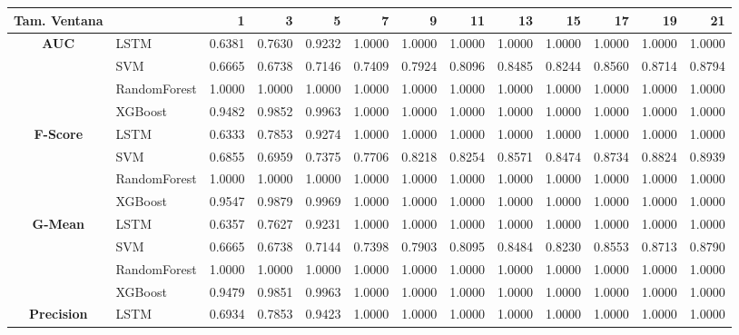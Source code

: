 \begin{table}[h]
	\centering
	\begin{adjustbox}{max width=15cm}
		\begin{tabular}{|c|l|r|r|r|r|r|r|r|r|r|r|r|}
			\hline
			\textbf{Tam. Ventana}&         &      1  &      3  &      5  &      7  &      9  &      11 &      13 &      15 &      17 &      19 &      21 \\
			\hline
			\textbf{AUC} & LSTM &  0.6381 &  0.7630 &  0.9232 &  1.0000 &  1.0000 &  1.0000 &  1.0000 &  1.0000 &  1.0000 &  1.0000 &  1.0000 \\
			& SVM &  0.6665 &  0.6738 &  0.7146 &  0.7409 &  0.7924 &  0.8096 &  0.8485 &  0.8244 &  0.8560 &  0.8714 &  0.8794 \\
			& RandomForest &  1.0000 &  1.0000 &  1.0000 &  1.0000 &  1.0000 &  1.0000 &  1.0000 &  1.0000 &  1.0000 &  1.0000 &  1.0000 \\
			& XGBoost &  0.9482 &  0.9852 &  0.9963 &  1.0000 &  1.0000 &  1.0000 &  1.0000 &  1.0000 &  1.0000 &  1.0000 &  1.0000 \\
			\hline
			\textbf{F-Score} & LSTM &  0.6333 &  0.7853 &  0.9274 &  1.0000 &  1.0000 &  1.0000 &  1.0000 &  1.0000 &  1.0000 &  1.0000 &  1.0000 \\
			& SVM &  0.6855 &  0.6959 &  0.7375 &  0.7706 &  0.8218 &  0.8254 &  0.8571 &  0.8474 &  0.8734 &  0.8824 &  0.8939 \\
			& RandomForest &  1.0000 &  1.0000 &  1.0000 &  1.0000 &  1.0000 &  1.0000 &  1.0000 &  1.0000 &  1.0000 &  1.0000 &  1.0000 \\
			& XGBoost &  0.9547 &  0.9879 &  0.9969 &  1.0000 &  1.0000 &  1.0000 &  1.0000 &  1.0000 &  1.0000 &  1.0000 &  1.0000 \\
			\hline
			\textbf{G-Mean} & LSTM &  0.6357 &  0.7627 &  0.9231 &  1.0000 &  1.0000 &  1.0000 &  1.0000 &  1.0000 &  1.0000 &  1.0000 &  1.0000 \\
			& SVM &  0.6665 &  0.6738 &  0.7144 &  0.7398 &  0.7903 &  0.8095 &  0.8484 &  0.8230 &  0.8553 &  0.8713 &  0.8790 \\
			& RandomForest &  1.0000 &  1.0000 &  1.0000 &  1.0000 &  1.0000 &  1.0000 &  1.0000 &  1.0000 &  1.0000 &  1.0000 &  1.0000 \\
			& XGBoost &  0.9479 &  0.9851 &  0.9963 &  1.0000 &  1.0000 &  1.0000 &  1.0000 &  1.0000 &  1.0000 &  1.0000 &  1.0000 \\
			\hline
			\textbf{Precision} & LSTM &  0.6934 &  0.7853 &  0.9423 &  1.0000 &  1.0000 &  1.0000 &  1.0000 &  1.0000 &  1.0000 &  1.0000 &  1.0000 \\

\end{tabular}
\end{adjustbox}
\end{table}

